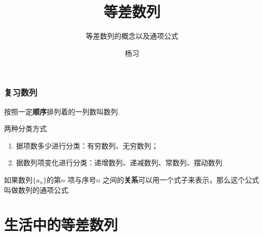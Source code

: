 \documentclass[12pt]{beamer}
\title{等差数列}
\subtitle{等差数列的概念以及通项公式}
\date{}
\author{杨习}
\institute{shineyoung7@163.com}
\begin{document}
\maketitle


\begin{frame}\frametitle{复习数列}
    
	\begin{description}[<+- | alert@+>]
		\item[数列的定义：] 按照一定\alert{\textbf{顺序}}排列着的一列数叫数列.
		\item[数列的分类：] 两种分类方式\\ 
			\begin{enumerate} 
				\item 据项数多少进行分类：有穷数列、无穷数列； 
				\item 据数列项变化进行分类：递增数列、递减数列、常数列、摆动数列 
			\end{enumerate}
		\item[数列的通项公式：] 如果数列$\{a_n\}$的第$n$ 项与序号$n$ 之间的\textbf{关系}可以用一个式子来表示，那么这个公式叫做数列的通项公式. 
	\end{description}
	\pause
\end{frame}

\section{生活中的等差数列}
\end{document}
